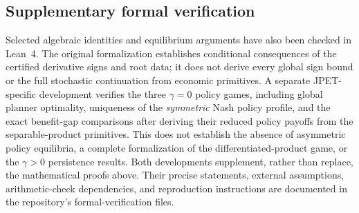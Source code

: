 \subsection{Supplementary formal verification}\label{app:formal-scope}

Selected algebraic identities and equilibrium arguments have also been checked in Lean~4. The original formalization establishes conditional consequences of the certified derivative signs and root data; it does not derive every global sign bound or the full stochastic continuation from economic primitives. A separate JPET-specific development verifies the three $\gamma=0$ policy games, including global planner optimality, uniqueness of the \emph{symmetric} Nash policy profile, and the exact benefit-gap comparisons after deriving their reduced policy payoffs from the separable-product primitives. This does not establish the absence of asymmetric policy equilibria, a complete formalization of the differentiated-product game, or the $\gamma>0$ persistence results. Both developments supplement, rather than replace, the mathematical proofs above. Their precise statements, external assumptions, arithmetic-check dependencies, and reproduction instructions are documented in the repository's formal-verification files.

